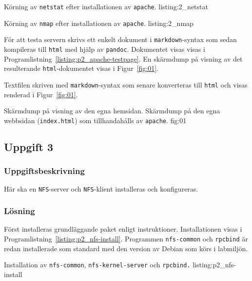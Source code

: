 						{Körning av \texttt{netstat} efter installationen av
					   \texttt{apache}.}
            {listing:2_netstat}

            {Körning av \texttt{nmap} efter installationen av
					   \texttt{apache}.}
            {listing:2_nmap}




För att testa servern skrivs ett enkelt dokument i
\texttt{markdown}\cite{Gruber2013}-syntax som sedan kompileras till
\texttt{html} med hjälp av \texttt{pandoc}\cite{MacFarlane2013}.
Dokumentet visas visas i Programlistning~\ref{listing:p2_apache-testpage}.
En skärmdump på visning av det resulterande \texttt{html}-dokumentet visas i
Figur~\ref{fig:01}.

\begin{listing}[H]
\caption{Textfilen skriven med \texttt{markdown}-syntax som senare konverteras
         till \texttt{html} och visas renderad i Figur~\ref{fig:01}.}
\label{listing:p2_apache-testpage}
\end{listing}

           {Skärmdump på visning av den egna hemsidan.}
           {Skärmdump på den egna webbsidan (\texttt{index.html}) som
            tillhandahålls av \texttt{apache}.}
           {fig:01}



\subsection{Uppgift 3}
\subsubsection{Uppgiftsbeskrivning}
Här ska en \texttt{NFS}-server och \texttt{NFS}-klient installeras och
konfigureras. 


\subsubsection{Lösning}
Först installeras grundläggande paket enligt instruktioner. 
Installationen visas i Programlistning~\ref{listing:p2_nfs-install}.
Programmen \texttt{nfs-common} och \texttt{rpcbind} är redan installerade
som standard med den version av Debian som körs i labmiljön.

						{Installation av \texttt{nfs-common}, \texttt{nfs-kernel-server}
             och \texttt{rpcbind.}}
            {listing:p2_nfs-install}


